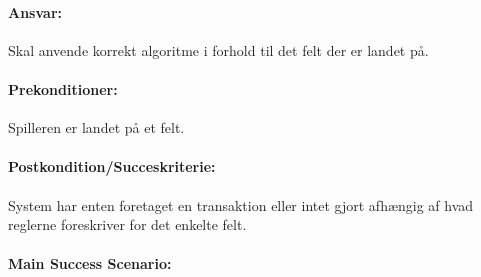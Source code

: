 \paragraph{Ansvar:} 
Skal anvende korrekt algoritme i forhold til det felt der er landet på.
 
\paragraph{Prekonditioner:} 
Spilleren er landet på et felt.

\paragraph{Postkondition/Succeskriterie:}
System har enten foretaget en transaktion eller intet gjort afhængig af hvad reglerne foreskriver for det enkelte felt.

\paragraph{Main Success Scenario:} 

